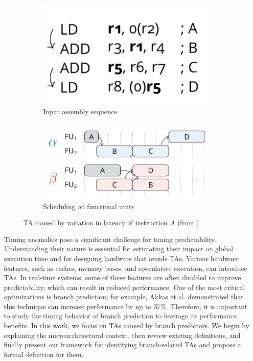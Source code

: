 \begin{figure}[H]
    \centering
    \begin{subfigure}[t]{0.3\textwidth}
        \centering
        \includegraphics[width=\textwidth]{figures/first-TA-ex-input.png}
        \caption{Input assembly sequence}
        \label{fig:TA1-code}
    \end{subfigure}
    \hfill
    \begin{subfigure}[t]{0.5\textwidth}
        \centering
        \includegraphics[width=\textwidth]{figures/first-TA-ex-trace.png}
        \caption{Scheduling on functional units}
        \label{fig:TA1-trace}
    \end{subfigure}
    \caption{TA caused by variation in latency of instruction \textit{A} (from \cite{binder_definitions_2022})}
    \label{fig:TA1}
\end{figure}

Timing anomalies pose a significant challenge for timing predictability. Understanding their nature is essential for estimating their impact on global execution time and for designing hardware that avoids TAs. Various hardware features, such as caches, memory buses, and speculative execution, can introduce TAs. In real-time systems, some of these features are often disabled to improve predictability, which can result in reduced performance. One of the most critical optimizations is branch prediction; for example, Akkas et al. \cite{Akkas2001} demonstrated that this technique can increase performance by up to $37\%$. Therefore, it is important to study the timing behavior of branch prediction to leverage its performance benefits. In this work, we focus on TAs caused by branch predictors. We begin by explaining the microarchitectural context, then review existing definitions, and finally present our framework for identifying branch-related TAs and propose a formal definition for them.
